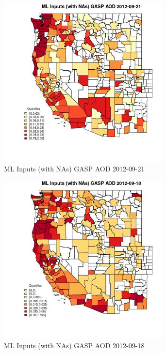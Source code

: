 \begin{figure} 
\centering  
\includegraphics[width=0.77\textwidth]{Code_Outputs/Report_ML_input_PM25_Step4_part_e_de_duplicated_aves_compiled_2019-05-14wNAs_CountyGASP_AODMean2012-09-21_2012-09-21.jpg} 
\caption{\label{fig:Report_ML_input_PM25_Step4_part_e_de_duplicated_aves_compiled_2019-05-14wNAsCountyGASP_AODMean2012-09-21_2012-09-21}ML Inputs (with NAs) GASP AOD 2012-09-21} 
\end{figure} 
 

\begin{figure} 
\centering  
\includegraphics[width=0.77\textwidth]{Code_Outputs/Report_ML_input_PM25_Step4_part_e_de_duplicated_aves_compiled_2019-05-14wNAs_CountyGASP_AODMean2012-09-18_2012-09-18.jpg} 
\caption{\label{fig:Report_ML_input_PM25_Step4_part_e_de_duplicated_aves_compiled_2019-05-14wNAsCountyGASP_AODMean2012-09-18_2012-09-18}ML Inputs (with NAs) GASP AOD 2012-09-18} 
\end{figure} 
 

